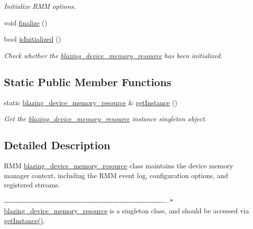 \begin{DoxyCompactItemize}
\begin{DoxyCompactList}\small\item\em Initialize R\+MM options. \end{DoxyCompactList}\item 
void \hyperlink{classblazing__device__memory__resource_ab92679fbcfe6a6075be76d3026e19b47}{finalize} ()
\item 
bool \hyperlink{classblazing__device__memory__resource_a01ae4b27062b3e30a22771edb4c625ac}{is\+Initialized} ()
\begin{DoxyCompactList}\small\item\em Check whether the \hyperlink{classblazing__device__memory__resource}{blazing\+\_\+device\+\_\+memory\+\_\+resource} has been initialized. \end{DoxyCompactList}\end{DoxyCompactItemize}
\subsection*{Static Public Member Functions}
\begin{DoxyCompactItemize}
\item 
static \hyperlink{classblazing__device__memory__resource}{blazing\+\_\+device\+\_\+memory\+\_\+resource} \& \hyperlink{classblazing__device__memory__resource_a31735d61d23aef05666c7c3f981c86fe}{get\+Instance} ()
\begin{DoxyCompactList}\small\item\em Get the \hyperlink{classblazing__device__memory__resource}{blazing\+\_\+device\+\_\+memory\+\_\+resource} instance singleton object. \end{DoxyCompactList}\end{DoxyCompactItemize}


\subsection{Detailed Description}
R\+MM \hyperlink{classblazing__device__memory__resource}{blazing\+\_\+device\+\_\+memory\+\_\+resource} class maintains the device memory manager context, including the R\+MM event log, configuration options, and registered streams. 

-\/-\/-\/-\/-\/-\/-\/-\/-\/-\/-\/-\/-\/-\/-\/-\/-\/-\/-\/-\/-\/-\/-\/-\/-\/-\/-\/-\/-\/-\/-\/-\/-\/-\/-\/-\/-\/-\/-\/-\/-\/-\/-\/-\/-\/-\/-\/-\/-\/-\/-\/-\/-\/-\/-\/-\/-\/-\/-\/-\/-\/-\/-\/-\/-\/-\/-\/-\/-\/-\/---$\ast$ \hyperlink{classblazing__device__memory__resource}{blazing\+\_\+device\+\_\+memory\+\_\+resource} is a singleton class, and should be accessed via \hyperlink{classblazing__device__memory__resource_a31735d61d23aef05666c7c3f981c86fe}{get\+Instance()}. 

